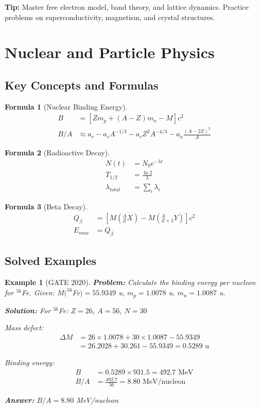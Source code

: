 \documentclass[12pt,a4paper]{article}
\newtheorem{example}{Example}[section]
\newtheorem{formula}{Formula}[section]
\newcommand{\ans}[1]{\textcolor{red!70!black}{\textbf{Answer:} #1}}
\newcommand{\sol}{\textcolor{blue!70!black}{\textbf{Solution:}}}
\newcommand{\tip}[1]{\textcolor{green!60!black}{\textbf{Tip:} #1}}
\begin{document}
\tip{Master free electron model, band theory, and lattice dynamics. Practice problems on superconductivity, magnetism, and crystal structures.}

\section{Nuclear and Particle Physics}

\subsection{Key Concepts and Formulas}

\begin{formula}[Nuclear Binding Energy]
\begin{align}
B &= [Zm_p + (A-Z)m_n - M]c^2\\
B/A &\approx a_v - a_s A^{-1/3} - a_c Z^2 A^{-4/3} - a_a \frac{(A-2Z)^2}{A}
\end{align}
\end{formula}

\begin{formula}[Radioactive Decay]
\begin{align}
N(t) &= N_0 e^{-\lambda t}\\
T_{1/2} &= \frac{\ln 2}{\lambda}\\
\lambda_{total} &= \sum_i \lambda_i
\end{align}
\end{formula}

\begin{formula}[Beta Decay]
\begin{align}
Q_\beta &= [M(^A_Z X) - M(^A_{Z+1} Y)]c^2\\
E_{max} &= Q_\beta
\end{align}
\end{formula}

\subsection{Solved Examples}

\begin{example}[GATE 2020]
\textbf{Problem:} Calculate the binding energy per nucleon for $^{56}$Fe. Given: $M(^{56}$Fe$) = 55.9349$ u, $m_p = 1.0078$ u, $m_n = 1.0087$ u.

\sol
For $^{56}$Fe: $Z = 26$, $A = 56$, $N = 30$

Mass defect:
\begin{align}
\Delta M &= 26 \times 1.0078 + 30 \times 1.0087 - 55.9349\\
&= 26.2028 + 30.261 - 55.9349 = 0.5289 \text{ u}
\end{align}

Binding energy:
\begin{align}
B &= 0.5289 \times 931.5 = 492.7 \text{ MeV}\\
B/A &= \frac{492.7}{56} = 8.80 \text{ MeV/nucleon}
\end{align}

\ans{$B/A = 8.80$ MeV/nucleon}
\end{example}
\end{document}
